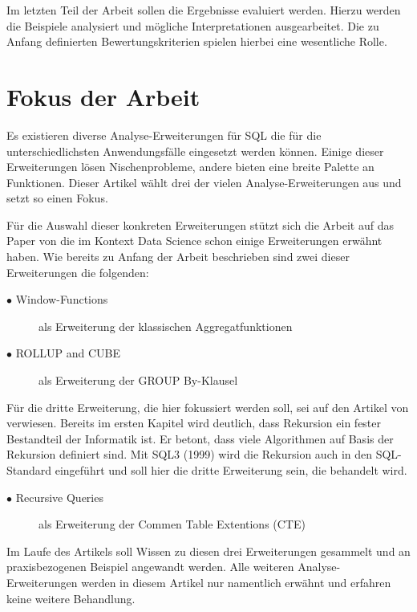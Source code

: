 Im letzten Teil der Arbeit sollen die Ergebnisse evaluiert werden. Hierzu werden
die Beispiele analysiert und mögliche Interpretationen ausgearbeitet. Die zu
Anfang definierten Bewertungskriterien spielen hierbei eine wesentliche Rolle.

\section{Fokus der Arbeit}
Es existieren diverse Analyse-Erweiterungen für SQL die für die
unterschiedlichsten Anwendungsfälle eingesetzt werden können. Einige dieser Erweiterungen
lösen Nischenprobleme, andere bieten eine breite Palette an Funktionen. Dieser Artikel
wählt drei der vielen Analyse-Erweiterungen aus und setzt so einen Fokus.

Für die Auswahl dieser konkreten Erweiterungen stützt sich die Arbeit auf das Paper
von \cite{FOTACHE2015243} die im Kontext Data Science schon einige Erweiterungen
erwähnt haben. Wie bereits zu Anfang der Arbeit beschrieben sind zwei dieser
Erweiterungen die folgenden:

\begin{description}
	\item[$\bullet$ Window-Functions] als Erweiterung der klassischen Aggregatfunktionen

	\item[$\bullet$ ROLLUP and CUBE] als Erweiterung der GROUP By-Klausel
\end{description}

Für die dritte Erweiterung, die hier fokussiert werden soll, sei auf den Artikel
von \cite{4460710} verwiesen. Bereits im ersten Kapitel wird deutlich, dass Rekursion
ein fester Bestandteil der Informatik ist. Er betont, dass viele Algorithmen auf
Basis der Rekursion definiert sind. Mit SQL3 (1999) wird die Rekursion auch in
den SQL-Standard eingeführt und soll hier die dritte Erweiterung sein, die behandelt
wird.

\begin{description}
	\item[$\bullet$ Recursive Queries] als Erweiterung der Commen Table Extentions
		(CTE)
\end{description}

Im Laufe des Artikels soll Wissen zu diesen drei Erweiterungen gesammelt und an
praxisbezogenen Beispiel angewandt werden. Alle weiteren Analyse-Erweiterungen werden
in diesem Artikel nur namentlich erwähnt und erfahren keine weitere Behandlung.